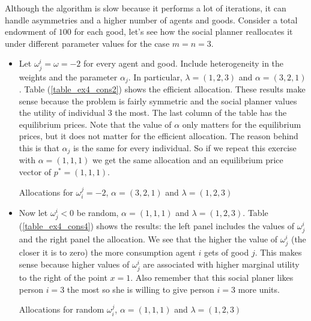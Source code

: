 \documentclass[a4paper,12pt]{article}
\begin{document}
    Although the algorithm is slow because it performs a lot of iterations, it can handle asymmetries and a higher number of agents and goods. Consider a total endowment of $100$ for each good, let's see how the social planner reallocates it under different parameter values for the case $m=n=3$. 
    
    \begin{itemize}
        \item Let $\omega_j^i = \omega = -2$ for every agent and good. Include heterogeneity in the weights and the parameter $\alpha_j$. In particular, $\lambda = (1,2,3)$ and $\alpha = (3,2,1)$. Table (\ref{table_ex4_cons2}) shows the efficient allocation. These results make sense because the problem is fairly symmetric and the social planner values the utility of individual $3$ the most. The last column of the table has the equilibrium prices. Note that the value of $\alpha$ only matters for the equilibrium prices, but it does not matter for the efficient allocation. The reason behind this is that $\alpha_j$ is the same for every individual. So if we repeat this exercise with $\alpha = (1,1,1)$ we get the same allocation and an equilibrium price vector of $p^* = (1,1,1)$. 
        
        \begin{table}[!htbp]
            \centering
            \caption[Short Caption for LoT]{Allocations for $\omega_i^j=-2$, $\alpha=(3,2,1)$ and $\lambda=(1,2,3)$}\label{table_ex4_cons2}
        \end{table}
        
        \item Now let $\omega_j^i<0$ be random, $\alpha = (1,1,1)$ and $\lambda = (1,2,3)$. Table (\ref{table_ex4_cons4}) shows the results: the left panel includes the values of $\omega_j^i$ and the right panel the allocation. We see that the higher the value of $\omega_j^i$ (the closer it is to zero) the more consumption agent $i$ gets of good $j$. This makes sense because higher values of $\omega_j^i$ are associated with higher marginal utility to the right of the point $x=1$. Also remember that this social planer likes person $i=3$ the most so she is willing to give person $i=3$ more units. 
        
        \begin{table}[!htbp]
            \centering
            \small
            \caption[Short Caption for LoT]{Allocations for random $\omega_i^j$, $\alpha=(1,1,1)$ and $\lambda=(1,2,3)$}\label{table_ex4_cons4}
             
            
        \end{table}
        
        
    \end{itemize}
    
\end{document}
